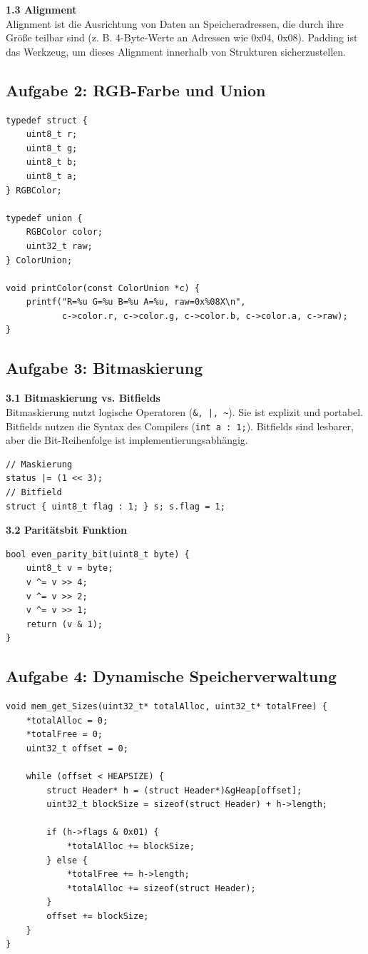\documentclass[12pt,a4paper]{article}
\begin{document}
\textbf{1.3 Alignment} \\
Alignment ist die Ausrichtung von Daten an Speicheradressen, die durch ihre Größe teilbar sind (z. B. 4-Byte-Werte an Adressen wie 0x04, 0x08). Padding ist das Werkzeug, um dieses Alignment innerhalb von Strukturen sicherzustellen.

\subsection{Aufgabe 2: RGB-Farbe und Union}

\begin{lstlisting}
typedef struct {
    uint8_t r;
    uint8_t g;
    uint8_t b;
    uint8_t a; 
} RGBColor;

typedef union {
    RGBColor color;
    uint32_t raw;
} ColorUnion;

void printColor(const ColorUnion *c) {
    printf("R=%u G=%u B=%u A=%u, raw=0x%08X\n",
           c->color.r, c->color.g, c->color.b, c->color.a, c->raw);
}
\end{lstlisting}
\newpage
\subsection{Aufgabe 3: Bitmaskierung}

\textbf{3.1 Bitmaskierung vs. Bitfields} \\
Bitmaskierung nutzt logische Operatoren (\texttt{\&, |, \textasciitilde}). Sie ist explizit und portabel. Bitfields nutzen die Syntax des Compilers (\texttt{int a : 1;}). Bitfields sind lesbarer, aber die Bit-Reihenfolge ist implementierungsabhängig.

\begin{lstlisting}
// Maskierung
status |= (1 << 3); 
// Bitfield
struct { uint8_t flag : 1; } s; s.flag = 1;
\end{lstlisting}

\textbf{3.2 Paritätsbit Funktion}
\begin{lstlisting}
bool even_parity_bit(uint8_t byte) {
    uint8_t v = byte;
    v ^= v >> 4;
    v ^= v >> 2;
    v ^= v >> 1;
    return (v & 1); 
}
\end{lstlisting}

\subsection{Aufgabe 4: Dynamische Speicherverwaltung}

\begin{lstlisting}
void mem_get_Sizes(uint32_t* totalAlloc, uint32_t* totalFree) {
    *totalAlloc = 0;
    *totalFree = 0;
    uint32_t offset = 0;

    while (offset < HEAPSIZE) {
        struct Header* h = (struct Header*)&gHeap[offset];
        uint32_t blockSize = sizeof(struct Header) + h->length;
        
        if (h->flags & 0x01) {
            *totalAlloc += blockSize;
        } else {
            *totalFree += h->length;
            *totalAlloc += sizeof(struct Header); 
        }
        offset += blockSize;
    }
}
\end{lstlisting}
\end{document}
